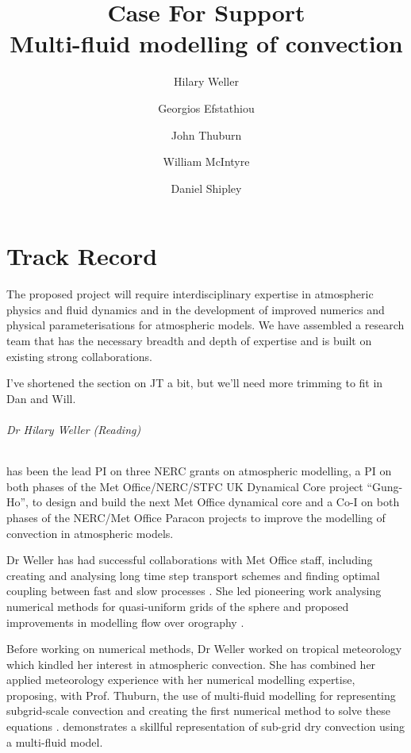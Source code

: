 \documentclass[11pt,a4paper]{article}
\begin{document}
\title{Case For Support \\ \Large
Multi-fluid modelling of convection
}
\author{Hilary Weller \and Georgios Efstathiou \and John Thuburn \and William McIntyre \and Daniel Shipley}
\date{}
\maketitle

\part{Track Record}

The proposed project will require interdisciplinary expertise in atmospheric physics and fluid dynamics
and in the development of improved numerics and physical parameterisations for atmospheric models.
We have assembled a research team that has the necessary breadth and depth of expertise and is built on
existing strong collaborations.

{\color{red} I've shortened the section on JT a bit, but we'll need more trimming to fit in Dan and Will.}

\paragraph*{Dr Hilary Weller (Reading)} has been the lead PI on three NERC grants on atmospheric modelling, a PI on both phases of the Met Office/NERC/STFC UK Dynamical Core project ``Gung-Ho'', to design and build the next Met Office dynamical core and a Co-I on both phases of the NERC/Met Office Paracon projects to improve the modelling of convection in atmospheric models.

Dr Weller has had successful collaborations with Met Office staff, including creating and analysing long time step transport schemes \cite[]{CWPS17,SWMD17} and finding optimal coupling between fast and slow processes \cite[][]{WLW13}. She led pioneering work analysing numerical methods for quasi-uniform grids of the sphere \cite[e.g.][]{WWF09,Wel12,WTC12} and proposed improvements in modelling flow over orography \cite[]{WS14}. 

Before working on numerical methods, Dr Weller worked on tropical meteorology \cite[e.g.][]{LGWS09} which kindled her interest in atmospheric convection. She has combined her applied meteorology experience with her numerical modelling expertise, proposing, with Prof. Thuburn, the use of multi-fluid modelling for representing subgrid-scale convection \cite[]{TWV+18} and creating the first numerical method to solve these equations \cite[]{WM19}. \cite{WMS20} demonstrates a skillful representation of sub-grid dry convection using a multi-fluid model.
\end{document}
